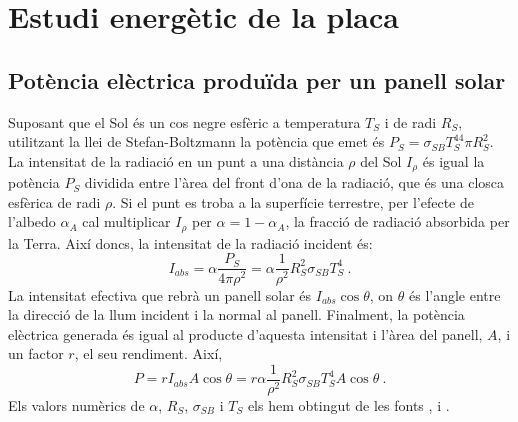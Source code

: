 \documentclass[11pt]{article}
\begin{document}
\section{Estudi energètic de la placa}
\subsection{Potència elèctrica produïda per un panell solar}
Suposant que el Sol és un cos negre esfèric a temperatura $T_S$ i de radi $R_S$, utilitzant la llei de Stefan-Boltzmann la potència que emet és $P_S=\sigma_{SB}T_S^44\pi R_S^2$. La intensitat de la radiació en un punt a una distància ${\rho}$ del Sol $I_{\rho}$ és igual la potència $P_S$ dividida entre l'àrea del front d'ona de la radiació, que és una closca esfèrica de radi ${\rho}$. Si el punt es troba a la superfície terrestre,  per l’efecte de l’albedo $\alpha_A$ cal multiplicar $I_{\rho}$ per $\alpha=1-\alpha_A$, la fracció de radiació absorbida per la Terra. Així doncs, la intensitat de la radiació incident és:
\begin{equation}
    I_{abs} = \alpha \frac{P_S}{4\pi \rho^2}=\alpha \frac{1}{\rho^2} R_S^2\sigma_{SB} T_S^4 \ .
    \label{I_abs}
\end{equation}
La intensitat efectiva que rebrà un panell solar és $I_{abs} \cos{\theta}$, on $\theta$ és l'angle entre la direcció de la llum incident i la normal al panell. Finalment, la potència elèctrica generada és igual al producte d'aquesta intensitat i l'àrea del panell, $A$, i un factor $r$, el seu rendiment. Així,
\begin{equation}
    P = r I_{abs} A \cos{\theta} = r \alpha \frac{1}{\rho^2}R_S^2\sigma_{SB}T_S^4A \cos{\theta} \ .
    \label{potencia placa}
\end{equation}
Els valors numèrics de $\alpha$, $R_S$, $\sigma_{SB}$ i $T_S$ els hem obtingut de les fonts \cite{Earth Fact Sheet}, \cite{Sun Fact Sheet} i \cite{Universe Glossary}.
\end{document}
